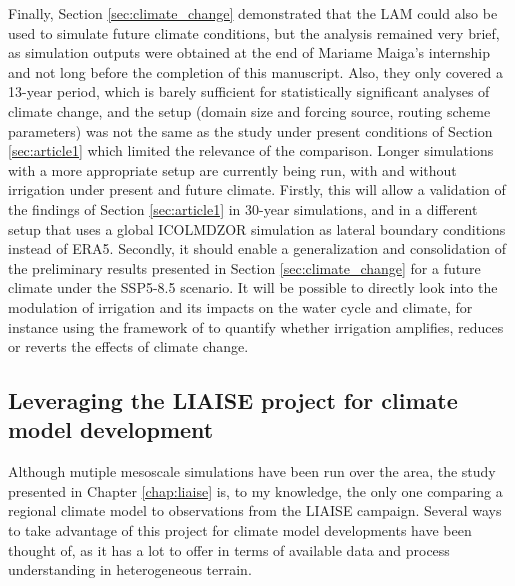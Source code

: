 Finally, Section \ref{sec:climate_change} demonstrated that the LAM could also be used to simulate future climate conditions, but the analysis remained very brief, as simulation outputs were obtained at the end of Mariame Maiga's internship and not long before the completion of this manuscript.
Also, they only covered a 13-year period, which is barely sufficient for statistically significant analyses of climate change, and the setup (domain size and forcing source, routing scheme parameters) was not the same as the study under present conditions of Section \ref{sec:article1} which limited the relevance of the comparison.
Longer simulations with a more appropriate setup are currently being run, with and without irrigation under present and future climate. Firstly, this will allow a validation of the findings of Section \ref{sec:article1} in 30-year simulations, and in a different setup that uses a global ICOLMDZOR simulation as lateral boundary conditions instead of ERA5. Secondly, it should enable a generalization and consolidation of the preliminary results presented in Section \ref{sec:climate_change} for a future climate under the SSP5-8.5 scenario. It will be possible to directly look into the modulation of irrigation and its impacts on the water cycle and climate, for instance using the framework of \citet{arboleda_obando_influence_2022} to quantify whether irrigation amplifies, reduces or reverts the effects of climate change.

\subsection{Leveraging the LIAISE project for climate model development}
Although mutiple mesoscale simulations have been run over the area, the study presented in Chapter \ref{chap:liaise} is, to my knowledge, the only one comparing a regional climate model to observations from the LIAISE campaign.
Several ways to take advantage of this project for climate model developments have been thought of, as it has a lot to offer in terms of available data and process understanding in heterogeneous terrain.


